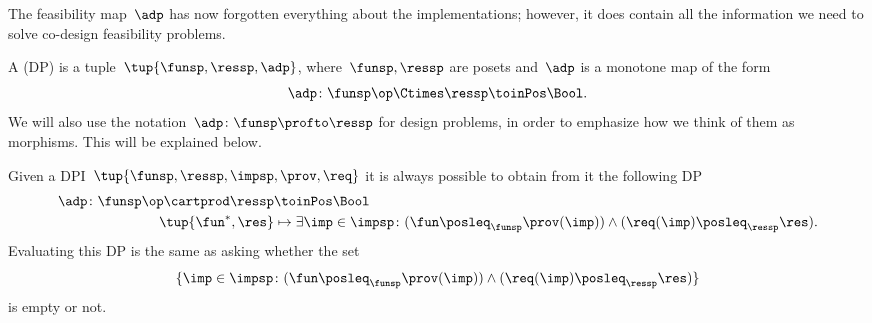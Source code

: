 The feasibility map~$\adp$ has now forgotten everything about the implementations; however, it does contain all the information we need to solve co-design feasibility problems.


\begin{definition}
    \label{def:design-problem}
    A  (DP) is a tuple~$\tup{\funsp, \ressp, \adp}$, where~$\funsp, \ressp$ are posets and~$\adp$ is a monotone map of the form%
    \begin{equation*}
        \label{eq:design_prob_as_monfun}
        \adp \colon  \funsp\op \Ctimes \ressp \toinPos \Bool.
    \end{equation*}
    We will also use the notation~$\adp \colon \funsp \profto \ressp$ for design problems, in order to emphasize how we think of them as morphisms.
    This will be explained below.
\end{definition}

\begin{remark}
    Given a DPI~$\tup{\funsp, \ressp, \impsp, \prov,\req}$ it is always possible to obtain from it the following DP
    \begin{equation}
        \label{eq:dpi_to_dp_1}
        \begin{aligned}
            \adp\colon \funsp\op \cartprod \ressp &\toinPos \Bool\\
            \tup{\fun^*,\res}&\mapsto \exists \imp \in \impsp \colon (\fun \posleq_\funsp \prov(\imp)) \wedge (\req(\imp)\posleq_\ressp \res).
        \end{aligned}
    \end{equation}
    Evaluating this DP is the same as asking whether the set
    \begin{equation}
        \label{eq:dpi_to_dp_2}
        \{ \imp \in \impsp \colon (\fun \posleq_\funsp \prov(\imp)) \wedge (\req(\imp)\posleq_\ressp \res)\}
    \end{equation}
    is empty or not.
\end{remark}

